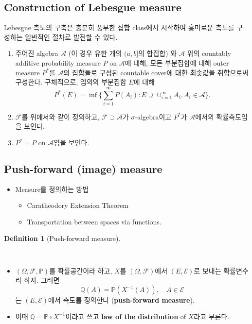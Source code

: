 \documentclass[
  13pt,
  letterpaper,
  DIV=11,
  numbers=noendperiod]{scrreprt}
\providecommand{\tightlist}{%
  \setlength{\itemsep}{0pt}\setlength{\parskip}{0pt}}\usepackage{longtable,booktabs,array}
\theoremstyle{plain}
\theoremstyle{definition}
\theoremstyle{definition}
\newtheorem{definition}{Definition}[chapter]
\theoremstyle{plain}
\theoremstyle{definition}
\theoremstyle{plain}
\theoremstyle{remark}
\begin{document}
\subsection{Construction of Lebesgue
measure}\label{construction-of-lebesgue-measure}

Lebesgue 측도의 구축은 충분히 풍부한 집합 class에서 시작하여 흥미로운
측도를 구성하는 일반적인 절차로 발전할 수 있다.

\begin{enumerate}
\def\labelenumi{\arabic{enumi}.}
\item
  주어진 algebra \(\mathcal{A}\) (이 경우 유한 개의 \((a,b]\)의 합집합)
  와 \(\mathcal{A}\) 위의 countably additive probability measure \(P\)
  on \(\mathcal{A}\)에 대해, 모든 부분집합에 대해 outer measure
  \(P^{*}\)를 \(\mathcal{A}\)의 집합들로 구성된 countable cover에 대한
  최솟값을 취함으로써 구성한다. 구체적으로, 임의의 부분집합 \(E\)에 대해
  \[
  P^{*}(E) = \inf \{\sum_{i=1}^{\infty} P(A_i): E \supseteq \cup_{i=1}^{\infty}A_i, A_i \in \mathcal{A} \}.
  \]
\item
  \(\mathcal{F}\)를 위에서와 같이 정의하고,
  \(\mathcal{F}\supset \mathcal{A}\)가 \(\sigma\)-algebra이고
  \(P^{*}\)가 \(\mathcal{A}\)에서의 확률측도임을 보인다.
\item
  \(P^{*}=P\) on \(\mathcal{A}\)임을 보인다.
\end{enumerate}

\subsection{Push-forward (image)
measure}\label{push-forward-image-measure}

\begin{itemize}
\tightlist
\item
  Measure를 정의하는 방법

  \begin{itemize}
  \tightlist
  \item
    Caratheodory Extension Theorem
  \item
    Transportation between spaces via functions.
  \end{itemize}
\end{itemize}

\begin{definition}[Push-forward
measure]\protect\hypertarget{def-pushforwardm}{}\label{def-pushforwardm}

~

\begin{itemize}
\item
  \((\Omega, \mathcal{F}, \mathbb{P})\)를 확률공간이라 하고, \(X\)를
  \((\Omega, \mathcal{F})\)에서 \((E, \mathcal{E})\)로 보내는 확률변수라
  하자. 그러면 \[
  \mathbb{Q}(A) = \mathbb{P}(X^{-1}(A)), \quad{} A\in \mathcal{E}
  \] 는 \((E,\mathcal{E})\)에서 측도를 정의한다 (\textbf{push-forward
  measure}).
\item
  이때 \(\mathbb{Q} = \mathbb{P}\circ X^{-1}\)이라고 쓰고 \textbf{law of
  the distribution} of \(X\)라고 부른다.
\end{itemize}

\end{definition}
\end{document}
